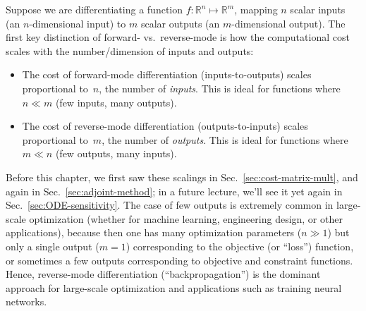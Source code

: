 Suppose we are differentiating a function $f: \mathbb{R}^n \mapsto \mathbb{R}^m$, mapping $n$ scalar inputs (an $n$-dimensional input) to $m$ scalar outputs (an $m$-dimensional output).   The first key distinction of forward- vs.~reverse-mode is how the computational cost scales with the number/dimension of inputs and outputs:
\begin{itemize}

\item The cost of forward-mode differentiation (inputs-to-outputs) scales proportional to~$n$, the number of \emph{inputs}.  This is ideal for functions where $n \ll m$ (few inputs, many outputs).

\item The cost of reverse-mode differentiation (outputs-to-inputs) scales proportional to~$m$, the number of \emph{outputs}.  This is ideal for functions where $m \ll n$ (few outputs, many inputs).

\end{itemize}
Before this chapter, we first saw these scalings in Sec.~\ref{sec:cost-matrix-mult}, and again in Sec.~\ref{sec:adjoint-method}; in a future lecture, we'll see it yet again in Sec.~\ref{sec:ODE-sensitivity}.  The case of few outputs is extremely common in large-scale optimization (whether for machine learning, engineering design, or other applications), because then one has many optimization parameters ($n\gg 1$) but only a single output ($m=1$) corresponding to the objective (or ``loss'') function, or sometimes a few outputs corresponding to objective and constraint functions.   Hence, reverse-mode differentiation (``backpropagation'') is the dominant approach for large-scale optimization and applications such as training neural networks.

